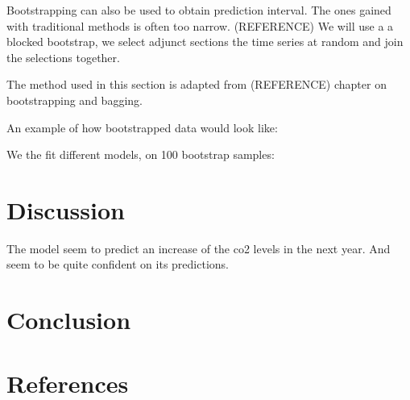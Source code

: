 \documentclass[]{article}
\begin{document}
Bootstrapping can also be used to obtain prediction interval. The ones
gained with traditional methods is often too narrow. (REFERENCE) We will
use a a blocked bootstrap, we select adjunct sections the time series at
random and join the selections together.

The method used in this section is adapted from (REFERENCE) chapter on
bootstrapping and bagging.

An example of how bootstrapped data would look like:

We the fit different models, on 100 bootstrap samples:

\hypertarget{discussion}{%
\section{Discussion}\label{discussion}}

The model seem to predict an increase of the co2 levels in the next
year. And seem to be quite confident on its predictions.

\hypertarget{conclusion}{%
\section{Conclusion}\label{conclusion}}

\hypertarget{references}{%
\section{References}\label{references}}
\end{document}
